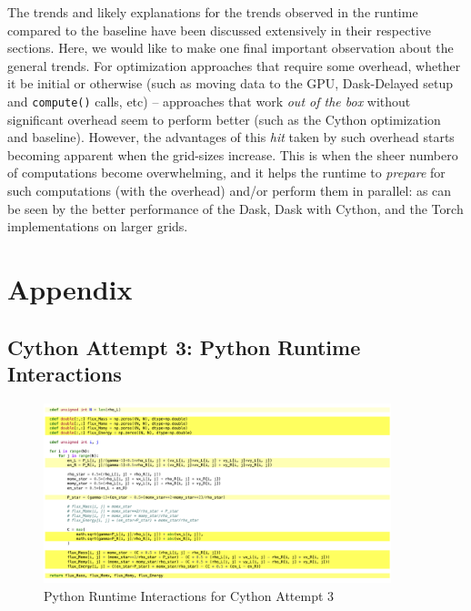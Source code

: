 \documentclass[a4paper,10pt]{article}
\begin{document}
The trends and likely explanations for the trends observed in the runtime compared to the baseline have been discussed extensively in their respective sections.
Here, we would like to make one final important observation about the general trends.
For optimization approaches that require some overhead, whether it be initial or otherwise (such as moving data to the GPU, Dask-Delayed setup and \verb|compute()| calls, etc) -- approaches that work \textit{out of the box} without significant overhead seem to perform better (such as the Cython optimization and baseline).
However, the advantages of this \textit{hit} taken by such overhead starts becoming apparent when the grid-sizes increase.
This is when the sheer numbero of computations become overwhelming, and it helps the runtime to \textit{prepare} for such computations (with the overhead) and/or perform them in parallel: as can be seen by the better performance of the Dask, Dask with Cython, and the Torch implementations on larger grids.

\section{Appendix}

\subsection{Cython Attempt 3: Python Runtime Interactions}
\begin{figure}[H]
  \centering
  \includegraphics[width=0.9\textwidth]{images/misc/cython_attempt_3_annotated.png}
  \caption{Python Runtime Interactions for Cython Attempt 3}
  \label{fig:cython_attempt_3_annotated}
\end{figure}
\end{document}
